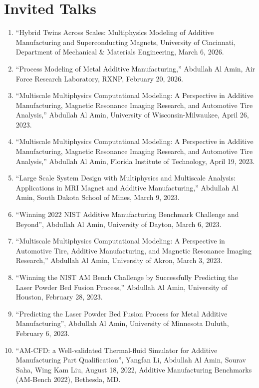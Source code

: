 \documentclass[11pt, letterpaper]{article}
\begin{document}
\section{Invited Talks}
    \begin{enumerate}[label=I\arabic*., itemsep=-1pt, topsep=2pt]    
        \item “Hybrid Twins Across Scales: Multiphysics Modeling of Additive Manufacturing and Superconducting Magnets, University of Cincinnati, Department of Mechanical \& Materials Engineering, March 6, 2026.
        \item “Process Modeling of Metal Additive Manufacturing,” Abdullah Al Amin, Air Force Research Laboratory, RXNP, February 20, 2026.
        \item “Multiscale Multiphysics Computational Modeling: A Perspective in Additive Manufacturing, Magnetic Resonance Imaging Research, and Automotive Tire Analysis,” Abdullah Al Amin, University of Wisconsin-Milwaukee, April 26, 2023.
        \item “Multiscale Multiphysics Computational Modeling: A Perspective in Additive Manufacturing, Magnetic Resonance Imaging Research, and Automotive Tire Analysis,” Abdullah Al Amin, Florida Institute of Technology, April 19, 2023.
        \item “Large Scale System Design with Multiphysics and Multiscale Analysis: Applications in MRI Magnet and Additive Manufacturing,” Abdullah Al Amin, South Dakota School of Mines, March 9, 2023.
        \item “Winning 2022 NIST Additive Manufacturing Benchmark Challenge and Beyond”, Abdullah Al Amin, University of Dayton, March 6, 2023.
        \item “Multiscale Multiphysics Computational Modeling: A Perspective in Automotive Tire, Additive Manufacturing, and Magnetic Resonance Imaging Research,” Abdullah Al Amin, University of Akron, March 3, 2023.
        \item “Winning the NIST AM Bench Challenge by Successfully Predicting the Laser Powder Bed Fusion Process,” Abdullah Al Amin, University of Houston, February 28, 2023.
        \item “Predicting the Laser Powder Bed Fusion Process for Metal Additive Manufacturing”, Abdullah Al Amin, University of Minnesota Duluth, February 6, 2023.
        \item “AM-CFD: a Well-validated Thermal-fluid Simulator for Additive Manufacturing Part Qualification”, Yangfan Li, Abdullah Al Amin, Sourav Saha, Wing Kam Liu, August 18, 2022, Additive Manufacturing Benchmarks (AM-Bench 2022), Bethesda, MD.

\end{enumerate}
\end{document}
